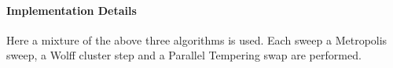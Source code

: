         \paragraph{Implementation Details}
            Here a mixture of the above three algorithms is used.
            Each sweep a Metropolis sweep, a Wolff cluster step and a
            Parallel Tempering swap are performed.
